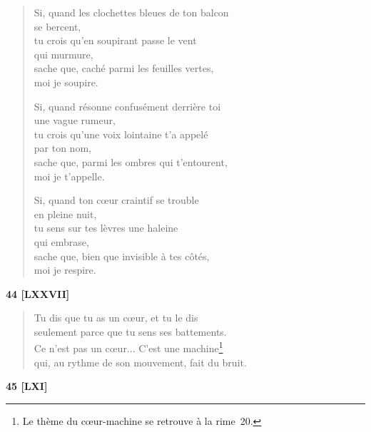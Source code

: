 \begin{verse}
  Si, quand les clochettes bleues de ton balcon \\
  se bercent, \\
  tu crois qu'en soupirant passe le vent \\
  qui murmure, \\
  sache que, caché parmi les feuilles vertes, \\
  moi je soupire.

  Si, quand résonne confusément derrière toi \\
  une vague rumeur, \\
  tu crois qu'une voix lointaine t'a appelé \\
  par ton nom, \\
  sache que, parmi les ombres qui t'entourent, \\
  moi je t'appelle.

  Si, quand ton cœur craintif se trouble \\
  en pleine nuit, \\
  tu sens sur tes lèvres une haleine \\
  qui embrase, \\
  sache que, bien que invisible à tes côtés, \\
  moi je respire.
\end{verse}

\bigskip

\begin{center}
  \textbf{44 [LXXVII]}
   \end{center}

\begin{verse}
  Tu dis que tu as un cœur, et tu le dis \\
  seulement parce que tu sens ses battements. \\
  Ce n'est pas un cœur... C'est une machine\footnote{Le thème du
  cœur-machine se retrouve à la rime~20.} \\
  qui, au rythme de son mouvement, fait du bruit.
\end{verse}

\pagebreak

\begin{center}
  \textbf{45 [LXI]}
\end{center}

